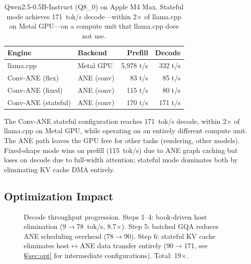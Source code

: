 \documentclass[11pt,twocolumn]{article}
\begin{document}
\begin{table}[t]
\centering
\footnotesize
\begin{tabular}{llrr}
\toprule
\textbf{Engine} & \textbf{Backend} & \textbf{Prefill} & \textbf{Decode} \\
\midrule
llama.cpp & Metal GPU & 5,978 t/s & 332 t/s \\
Conv-ANE (flex) & ANE (conv) & 83 t/s & 85 t/s \\
Conv-ANE (fixed) & ANE (conv) & 115 t/s & 80 t/s \\
Conv-ANE (stateful) & ANE (conv) & 170 t/s & 171 t/s \\
\bottomrule
\end{tabular}
\caption{Qwen2.5-0.5B-Instruct (Q8\_0) on Apple M4 Max. Stateful mode
achieves 171~tok/s decode---within 2$\times$ of llama.cpp on Metal
GPU---on a compute unit that llama.cpp does not use.}
\label{tab:transformer}
\end{table}

The Conv-ANE stateful configuration reaches 171~tok/s decode, within
2$\times$ of llama.cpp on Metal GPU, while operating on an entirely
different compute unit. The ANE path leaves the GPU free for other
tasks (rendering, other models). Fixed-shape mode wins on prefill
(115~tok/s) due to ANE graph caching but loses on decode due to
full-width attention; stateful mode dominates both by eliminating KV
cache DMA entirely.

\subsection{Optimization Impact}

\begin{figure}[t]
\centering
{}
\caption{Decode throughput progression.  Steps 1--4: book-driven host
elimination (9$\to$78~tok/s, 8.7$\times$).  Step 5: batched GQA
reduces ANE scheduling overhead (78$\to$90).  Step 6: stateful KV
cache eliminates host$\leftrightarrow$ANE data transfer entirely
(90$\to$171, see \S\ref{sec:opt} for intermediate configurations).
Total: 19$\times$.}
\label{fig:optbar}
\end{figure}
\end{document}
